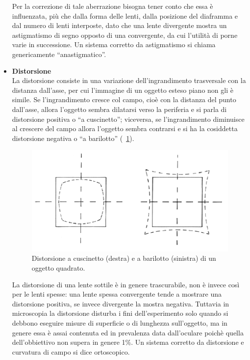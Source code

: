 \begin{itemize}
Per la correzione di tale aberrazione bisogna tener conto che essa è influenzata, più che dalla forma delle lenti, dalla posizione del diaframma e dal numero di lenti interposte, dato che una lente divergente mostra un astigmatismo di segno opposto di una convergente, da cui l'utilità di porne varie in successione. 
Un sistema corretto da astigmatismo si chiama genericamente ``anastigmatico''. 

\item \textbf{Distorsione}\\
La distorsione consiste in una variazione dell'ingrandimento trasversale con la distanza dall'asse, per cui l'immagine di un oggetto esteso piano non gli è simile. 
Se l'ingrandimento cresce col campo, cioè con la distanza del punto dall'asse, allora l'oggetto sembra dilatarsi verso la periferia e si parla di distorsione positiva o ``a cuscinetto''; viceversa, se l'ingrandimento diminuisce al crescere del campo allora l'oggetto sembra contrarsi e si ha la cosiddetta distorsione negativa o ``a barilotto'' (\figurename~\ref{fig:distorsione}).

\begin{figure}
 \centering
 \includegraphics[scale=.60]{img/CAP2disto.png}
 \caption{\small{Distorsione a cuscinetto (destra) e a barilotto (sinistra) di un oggetto quadrato.}}
 \label{fig:distorsione}
\end{figure}

La distorsione di una lente sottile è in genere trascurabile, non è invece così per le lenti spesse: una lente spessa convergente tende a mostrare una distorsione positiva, se invece divergente la mostra negativa.
Tuttavia in microscopia la distorsione disturba i fini dell'esperimento solo quando si debbono eseguire misure di superficie o di lunghezza sull'oggetto, ma in genere essa è assai contenuta ed in prevalenza data dall'oculare poichè quella dell'obbiettivo non supera in genere 1\%.
Un sistema corretto da distorsione e curvatura di campo si dice ortoscopico.

\end{itemize}


